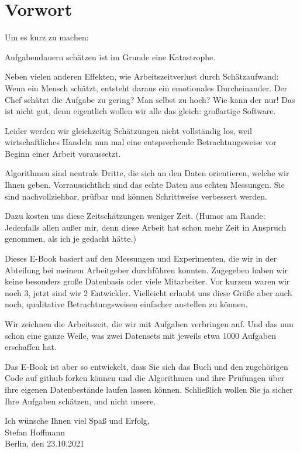 \hypertarget{foreword}{%
\section{Vorwort}\label{foreword}}

Um es kurz zu machen: 

Aufgabendauern schätzen ist im Grunde eine Katastrophe. 

Neben vielen anderen Effekten, wie Arbeitszeitverlust durch Schätzaufwand: Wenn ein Mensch schätzt, entsteht daraus ein emotionales Durcheinander. Der Chef schätzt die Aufgabe zu gering? Man selbst zu hoch? Wie kann der nur! Das ist nicht gut, denn eigentlich wollen wir alle das gleich: großartige Software.

Leider werden wir gleichzeitig Schätzungen nicht vollständig los, weil wirtschaftliches Handeln nun mal eine entsprechende Betrachtungsweise vor Beginn einer Arbeit voraussetzt. 

Algorithmen sind neutrale Dritte, die sich an den Daten orientieren, welche wir Ihnen geben. Vorraussichtlich sind das echte Daten aus echten Messungen. Sie sind nachvollziehbar, prüfbar und können Schrittweise verbessert werden.

Dazu kosten uns diese Zeitschätzungen weniger Zeit. (Humor am Rande: Jedenfalls allen außer mir, denn diese Arbeit hat schon mehr Zeit in Anspruch genommen, als ich je gedacht hätte.)

Dieses E-Book basiert auf den Messungen und Experimenten, die wir in der Abteilung bei meinem Arbeitgeber durchführen konnten. Zugegeben haben wir keine besonders große Datenbasis oder viele Mitarbeiter. Vor kurzem waren wir noch 3, jetzt sind wir 2 Entwickler. Vielleicht erlaubt uns diese Größe aber auch noch, qualitative Betrachtungsweisen einfacher anstellen zu können. 

Wir zeichnen die Arbeitszeit, die wir mit Aufgaben verbringen auf. Und das nun schon eine ganze Weile, was zwei Datensets mit jeweils etwa 1000 Aufgaben erschaffen hat. 

Das E-Book ist aber so entwickelt, dass Sie sich das Buch und den zugehörigen Code auf github forken können und die Algorithmen und ihre Prüfungen über ihre eigenen Datenbestände laufen lassen können. Schließlich wollen Sie ja sicher Ihre Aufgaben schätzen, und nicht unsere.

Ich wünsche Ihnen viel Spaß und Erfolg,\\
Stefan Hoffmann\\
Berlin, den 23.10.2021

